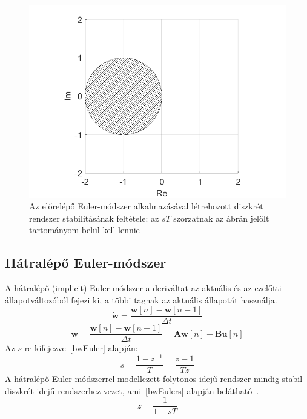 \begin{figure}[H]
    \centering
    \includegraphics[scale=0.5]{figures/fwEulerS.png}
    \caption{Az előrelépő Euler-módszer alkalmazásával létrehozott diszkrét rendszer stabilitásának feltétele: az $sT$ szorzatnak az ábrán jelölt tartományom belül kell lennie}
\end{figure}

\subsection{Hátralépő Euler-módszer}\label{bwEulerSection}

A hátralépő (implicit) Euler-módszer a deriváltat az aktuális és az ezelőtti állapotváltozóból fejezi ki, a többi tagnak
az aktuális állapotát használja.
\begin{equation}
    \mathbf{\dot{w}}=\frac{\mathbf{w}[n]-\mathbf{w}[n-1]}{\Delta{}t}
\label{bwEuler}
\end{equation}
\begin{equation}
    \mathbf{\dot{w}}=\frac{\mathbf{w}[n]-\mathbf{w}[n-1]}{\Delta{}t}=\mathbf{A}\mathbf{w}[n]+\mathbf{Bu}[n]
\end{equation}
Az $s$-re kifejezve~\ref{bwEuler} alapján:
\begin{equation}
    s=\frac{1-z^{-1}}{T}=\frac{z-1}{Tz}
\label{bwEulers}
\end{equation}
A hátralépő Euler-módszerrel modellezett folytonos idejű rendszer mindig stabil diszkrét idejű rendszerhez vezet, 
ami~\ref{bwEulers} alapján belátható~\cite{transformations}.  
\begin{equation}
    z=\frac{1}{1-sT}
\end{equation}

